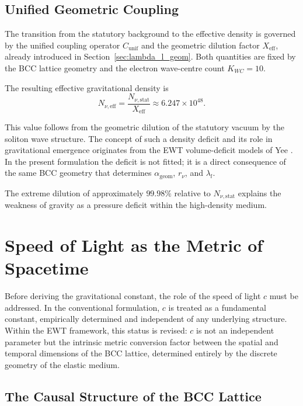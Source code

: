 \documentclass[10pt,a4paper]{article}
\begin{document}
\subsection{Unified Geometric Coupling}
\label{sec:unified_coupling}

The transition from the statutory background to the effective density is governed by the unified coupling operator \(C_{\text{unif}}\) and the geometric dilution factor \(X_{\text{eff}}\), already introduced in Section~\ref{sec:lambda_l_geom}. Both quantities are fixed by the BCC lattice geometry and the electron wave-centre count \(K_{WC}=10\).

The resulting effective gravitational density is
\begin{equation}
	N_{\nu,\text{eff}} = \frac{N_{\nu,\text{stat}}}{X_{\text{eff}}}
	\approx
	6.247 \times 10^{48}.
	\label{eq:N_nu_effective_eff}
\end{equation}

This value follows from the geometric dilution of the statutory vacuum by the soliton wave structure. The concept of such a density deficit and its role in gravitational emergence originates from the EWT volume-deficit models of Yee \cite{yee2019spacetime, Yee2020Aether}. In the present formulation the deficit is not fitted; it is a direct consequence of the same BCC geometry that determines \(\alpha_{\text{geom}}\), \(r_\nu\), and \(\lambda_l\).

The extreme dilution of approximately \(99.98\%\) relative to \(N_{\nu,\text{stat}}\) explains the weakness of gravity as a pressure deficit within the high-density medium.

\section{Speed of Light as the Metric of Spacetime}
\label{sec:c_as_metric}
Before deriving the gravitational constant, the role of the speed of light \(c\) must be addressed. In the conventional formulation, \(c\) is treated as a fundamental constant, empirically determined and independent of any underlying structure. Within the EWT framework, this status is revised: \(c\) is not an independent parameter but the intrinsic metric conversion factor between the spatial and temporal dimensions of the BCC lattice, determined entirely by the discrete geometry of the elastic medium.

\subsection{The Causal Structure of the BCC Lattice}
\end{document}
